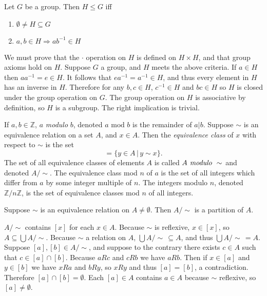 \documentclass{article}
\begin{document}
\begin{thm}
	Let \(G\) be a group. Then \(H\leq G\) iff
	\begin{enumerate}
		\item \(\emptyset\neq H\subseteq G\)
		\item \(a,b\in H\Rightarrow ab^{-1}\in H\)
	\end{enumerate}
	\begin{IEEEproof}
		We must prove that the \(\cdot\) operation on \(H\) is defined on \(H\times H\), and that group axioms hold on \(H\). Suppose \(G\) a group, and \(H\) meets the above criteria. If \(a\in H\) then \(aa^{-1}=e\in H\). It follows that \(ea^{-1}=a^{-1}\in H\), and thus every element in \(H\) has an inverse in \(H\). Therefore for any \(b,c\in H\), \(c^{-1}\in H\) and \(bc\in H\) so \(H\) is closed under the group operation on \(G\). The group operation on \(H\) is associative by definition, so \(H\) is a subgroup. The right implication is trivial.
	\end{IEEEproof}
\end{thm}
\begin{defi}
	If \(a,b\in\mathbb{Z}\), \(a\) \emph{modulo} \(b\), denoted \(a\text{ mod }b\) is the remainder of \(a|b\). Suppose \(\sim\) is an equivalence relation on a set \(A\), and \(x\in A\). Then the \emph{equivalence class} of \(x\) with respect to \(\sim\) is the set
	\begin{equation*}
		[x]=\{y\in A\,|\,y\sim x\}.
	\end{equation*}
	The set of all equivalence classes of elements \(A\) is called \(A\emph{ modulo }\sim\) and denoted \(A/\sim\). The equivalence class mod \(n\) of \(a\) is the set of all integers which differ from \(a\) by some integer multiple of \(n\). The integers modulo \(n\), denoted \(\mathbb{Z}/n\mathbb{Z}\), is the set of equivalence classes mod \(n\) of all integers.
\end{defi}
\begin{thm}
	\label{equivpartition}
	Suppose \(\sim\) is an equivalence relation on \(A\neq\emptyset\). Then \(A/\sim\) is a partition of \(A\).
	\begin{IEEEproof}
		\(A/\sim\) contains \([x]\) for each \(x\in A\). Because \(\sim\) is reflexive, \(x\in[x]\), so \(A\subseteq\bigcup A/\sim\). Because \(\sim\) a relation on \(A\), \(\bigcup A/\sim\,\subseteq A\), and thus \(\bigcup A/\sim\,=A\). Suppose \([a],[b]\in A/\sim\), and suppose to the contrary there exists \(c\in A\) such that \(c\in[a]\cap[b]\). Because \(aRc\) and \(cRb\) we have \(aRb\). Then if \(x\in[a]\) and \(y\in[b]\) we have \(xRa\) and \(bRy\), so \(xRy\) and thus \([a]=[b]\), a contradiction. Therefore \([a]\cap[b]=\emptyset\). Each \([a]\in A\) contains \(a\in A\) because \(\sim\) reflexive, so \([a]\neq\emptyset\).
	\end{IEEEproof}
\end{thm}
\clearpage
\end{document}
